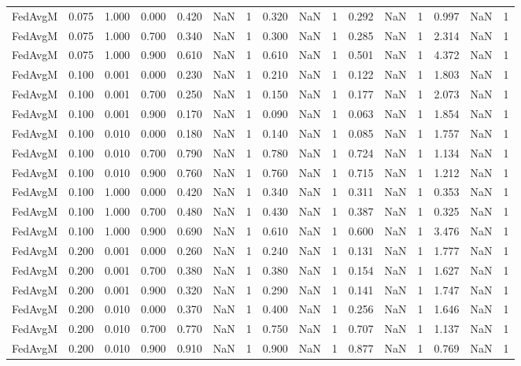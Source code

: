 \begin{table}[htbp]
\begin{tabular}{lccccccccccccccc}
FedAvgM & 0.075 & 1.000 & 0.000 & 0.420 & NaN & 1 & 0.320 & NaN & 1 & 0.292 & NaN & 1 & 0.997 & NaN & 1 \\
FedAvgM & 0.075 & 1.000 & 0.700 & 0.340 & NaN & 1 & 0.300 & NaN & 1 & 0.285 & NaN & 1 & 2.314 & NaN & 1 \\
FedAvgM & 0.075 & 1.000 & 0.900 & 0.610 & NaN & 1 & 0.610 & NaN & 1 & 0.501 & NaN & 1 & 4.372 & NaN & 1 \\
FedAvgM & 0.100 & 0.001 & 0.000 & 0.230 & NaN & 1 & 0.210 & NaN & 1 & 0.122 & NaN & 1 & 1.803 & NaN & 1 \\
FedAvgM & 0.100 & 0.001 & 0.700 & 0.250 & NaN & 1 & 0.150 & NaN & 1 & 0.177 & NaN & 1 & 2.073 & NaN & 1 \\
FedAvgM & 0.100 & 0.001 & 0.900 & 0.170 & NaN & 1 & 0.090 & NaN & 1 & 0.063 & NaN & 1 & 1.854 & NaN & 1 \\
FedAvgM & 0.100 & 0.010 & 0.000 & 0.180 & NaN & 1 & 0.140 & NaN & 1 & 0.085 & NaN & 1 & 1.757 & NaN & 1 \\
FedAvgM & 0.100 & 0.010 & 0.700 & 0.790 & NaN & 1 & 0.780 & NaN & 1 & 0.724 & NaN & 1 & 1.134 & NaN & 1 \\
FedAvgM & 0.100 & 0.010 & 0.900 & 0.760 & NaN & 1 & 0.760 & NaN & 1 & 0.715 & NaN & 1 & 1.212 & NaN & 1 \\
FedAvgM & 0.100 & 1.000 & 0.000 & 0.420 & NaN & 1 & 0.340 & NaN & 1 & 0.311 & NaN & 1 & 0.353 & NaN & 1 \\
FedAvgM & 0.100 & 1.000 & 0.700 & 0.480 & NaN & 1 & 0.430 & NaN & 1 & 0.387 & NaN & 1 & 0.325 & NaN & 1 \\
FedAvgM & 0.100 & 1.000 & 0.900 & 0.690 & NaN & 1 & 0.610 & NaN & 1 & 0.600 & NaN & 1 & 3.476 & NaN & 1 \\
FedAvgM & 0.200 & 0.001 & 0.000 & 0.260 & NaN & 1 & 0.240 & NaN & 1 & 0.131 & NaN & 1 & 1.777 & NaN & 1 \\
FedAvgM & 0.200 & 0.001 & 0.700 & 0.380 & NaN & 1 & 0.380 & NaN & 1 & 0.154 & NaN & 1 & 1.627 & NaN & 1 \\
FedAvgM & 0.200 & 0.001 & 0.900 & 0.320 & NaN & 1 & 0.290 & NaN & 1 & 0.141 & NaN & 1 & 1.747 & NaN & 1 \\
FedAvgM & 0.200 & 0.010 & 0.000 & 0.370 & NaN & 1 & 0.400 & NaN & 1 & 0.256 & NaN & 1 & 1.646 & NaN & 1 \\
FedAvgM & 0.200 & 0.010 & 0.700 & 0.770 & NaN & 1 & 0.750 & NaN & 1 & 0.707 & NaN & 1 & 1.137 & NaN & 1 \\
FedAvgM & 0.200 & 0.010 & 0.900 & 0.910 & NaN & 1 & 0.900 & NaN & 1 & 0.877 & NaN & 1 & 0.769 & NaN & 1 \\

\end{tabular}
\end{table}
